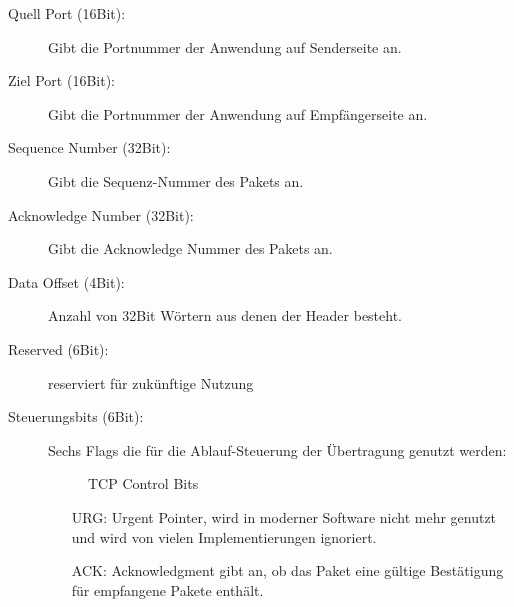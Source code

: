 \begin{description}

\item[Quell Port (16Bit): ] Gibt die Portnummer der Anwendung auf Senderseite an. 
\item[Ziel Port (16Bit): ] Gibt die Portnummer der Anwendung auf Empfängerseite an.
\item[Sequence Number (32Bit): ] Gibt die Sequenz-Nummer des Pakets an.
\item[Acknowledge Number (32Bit): ] Gibt die Acknowledge Nummer des Pakets an.
\item[Data Offset (4Bit): ] Anzahl von 32Bit Wörtern aus denen der Header besteht. 
\item[Reserved (6Bit): ] reserviert für zukünftige Nutzung
\item[Steuerungsbits (6Bit): ] Sechs Flags die für die Ablauf-Steuerung der Übertragung genutzt werden: 
\begin{figure}[htp]
\centering
{}
\caption{TCP Control Bits}
\label{fig_ControlBits}
\end{figure}
\begin{itemize}
\item[URG: ] Urgent Pointer, wird in moderner Software nicht mehr genutzt und wird von vielen Implementierungen ignoriert. 
\item[ACK: ] Acknowledgment gibt an, ob das Paket eine gültige Bestätigung für empfangene Pakete enthält.

\end{itemize}
\end{description}
